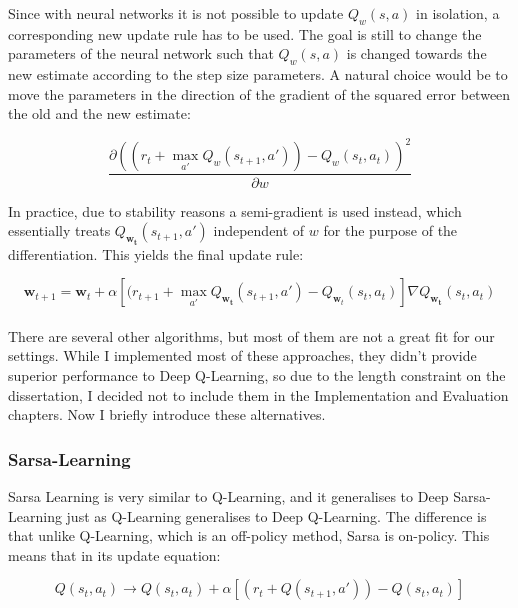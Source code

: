 Since with neural networks it is not possible to update $Q_w(s, a)$ in isolation, a corresponding new update rule has to be used. The goal is still to change the parameters of the neural network such that $Q_w(s, a)$ is changed towards the new estimate according to the step size parameters. A natural choice would be to move the parameters in the direction of the gradient of the squared error between the old and the new estimate:

$$\frac{\partial (( r_t + \max_{a'} Q_w(s_{t+1}, a')) - Q_w(s_t,a_t))^2}{\partial w}$$


In practice, due to stability reasons  a semi-gradient is used instead, which essentially treats $Q_{\mathbf{w_t}}(s_{t+1}, a')$ independent of $w$ for the purpose of the differentiation. This yields the final update rule:


\begin{equation} \label{eq:deep-q-learning-update-with-semi-gradient}
\mathbf{w}_{t+1} = \mathbf{w}_t + \alpha[( r_{t+1}+ \max_{a'} Q_{\mathbf{w_t}}(s_{t+1}, a') - Q_{\mathbf{w}_t}(s_t,a_t)]\nabla Q_{\mathbf{w_t}}(s_{t}, a_t)
\end{equation}\\



There are several other algorithms, but most of them are not a great fit for our settings. While I implemented most of these approaches, they didn't provide superior performance to Deep Q-Learning, so due to the length constraint on the dissertation, I decided not to include them in the Implementation and Evaluation chapters. Now I briefly introduce these alternatives. 

\subsubsection{Sarsa-Learning}

Sarsa Learning is very similar to Q-Learning, and it generalises to Deep Sarsa-Learning just as Q-Learning generalises to Deep Q-Learning. The difference is that unlike Q-Learning, which is an off-policy method, Sarsa is on-policy. This means that in its update equation:

\begin{equation} \label{eq:sarsa-learningUpdate}
Q(s_t,a_t) \longrightarrow Q(s_t,a_t) + \alpha[( r_t + Q(s_{t+1}, a')) - Q(s_t,a_t)]
\end{equation}

